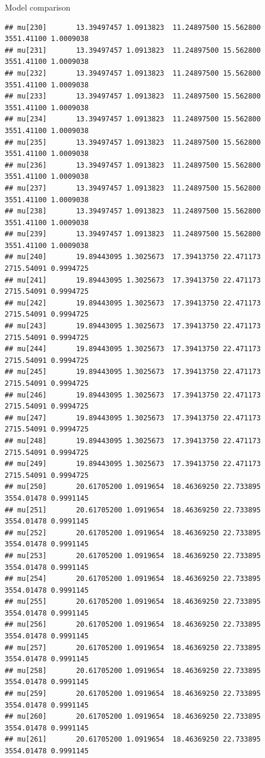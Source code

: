 \documentclass[
  ignorenonframetext,
]{beamer}
\begin{document}
\begin{frame}[fragile]{Model comparison}
\begin{verbatim}
## mu[230]       13.39497457 1.0913823  11.24897500 15.562800 3551.41100 1.0009038
## mu[231]       13.39497457 1.0913823  11.24897500 15.562800 3551.41100 1.0009038
## mu[232]       13.39497457 1.0913823  11.24897500 15.562800 3551.41100 1.0009038
## mu[233]       13.39497457 1.0913823  11.24897500 15.562800 3551.41100 1.0009038
## mu[234]       13.39497457 1.0913823  11.24897500 15.562800 3551.41100 1.0009038
## mu[235]       13.39497457 1.0913823  11.24897500 15.562800 3551.41100 1.0009038
## mu[236]       13.39497457 1.0913823  11.24897500 15.562800 3551.41100 1.0009038
## mu[237]       13.39497457 1.0913823  11.24897500 15.562800 3551.41100 1.0009038
## mu[238]       13.39497457 1.0913823  11.24897500 15.562800 3551.41100 1.0009038
## mu[239]       13.39497457 1.0913823  11.24897500 15.562800 3551.41100 1.0009038
## mu[240]       19.89443095 1.3025673  17.39413750 22.471173 2715.54091 0.9994725
## mu[241]       19.89443095 1.3025673  17.39413750 22.471173 2715.54091 0.9994725
## mu[242]       19.89443095 1.3025673  17.39413750 22.471173 2715.54091 0.9994725
## mu[243]       19.89443095 1.3025673  17.39413750 22.471173 2715.54091 0.9994725
## mu[244]       19.89443095 1.3025673  17.39413750 22.471173 2715.54091 0.9994725
## mu[245]       19.89443095 1.3025673  17.39413750 22.471173 2715.54091 0.9994725
## mu[246]       19.89443095 1.3025673  17.39413750 22.471173 2715.54091 0.9994725
## mu[247]       19.89443095 1.3025673  17.39413750 22.471173 2715.54091 0.9994725
## mu[248]       19.89443095 1.3025673  17.39413750 22.471173 2715.54091 0.9994725
## mu[249]       19.89443095 1.3025673  17.39413750 22.471173 2715.54091 0.9994725
## mu[250]       20.61705200 1.0919654  18.46369250 22.733895 3554.01478 0.9991145
## mu[251]       20.61705200 1.0919654  18.46369250 22.733895 3554.01478 0.9991145
## mu[252]       20.61705200 1.0919654  18.46369250 22.733895 3554.01478 0.9991145
## mu[253]       20.61705200 1.0919654  18.46369250 22.733895 3554.01478 0.9991145
## mu[254]       20.61705200 1.0919654  18.46369250 22.733895 3554.01478 0.9991145
## mu[255]       20.61705200 1.0919654  18.46369250 22.733895 3554.01478 0.9991145
## mu[256]       20.61705200 1.0919654  18.46369250 22.733895 3554.01478 0.9991145
## mu[257]       20.61705200 1.0919654  18.46369250 22.733895 3554.01478 0.9991145
## mu[258]       20.61705200 1.0919654  18.46369250 22.733895 3554.01478 0.9991145
## mu[259]       20.61705200 1.0919654  18.46369250 22.733895 3554.01478 0.9991145
## mu[260]       20.61705200 1.0919654  18.46369250 22.733895 3554.01478 0.9991145
## mu[261]       20.61705200 1.0919654  18.46369250 22.733895 3554.01478 0.9991145

\end{verbatim}
\end{frame}
\end{document}
